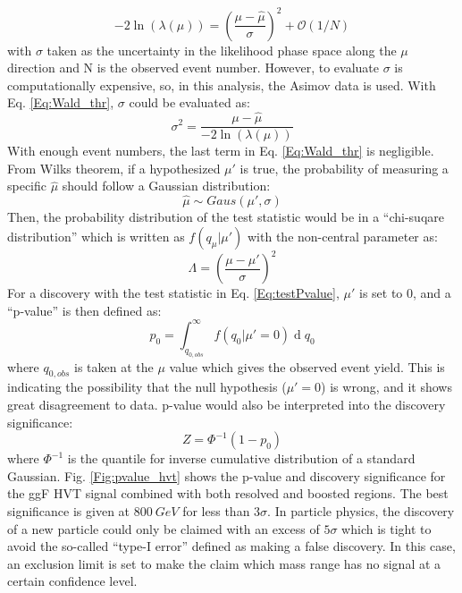 \begin{equation}
\label{Eq:Wald_thr}
-2\ln(\lambda(\mu))=(\frac{\mu-\hat{\mu}}{\sigma})^2+\mathcal{O}(1/N)
\end{equation}
with $\sigma$ taken as the uncertainty in the likelihood phase space along the $\mu$ direction and N is the observed event number. However, to evaluate $\sigma$ is computationally expensive, so, in this analysis, the Asimov data is used. With Eq. \ref{Eq:Wald_thr}, $\sigma$ could be evaluated as:
\begin{equation}
\sigma^2 = \frac{\mu-\hat{\mu}}{-2\ln(\lambda(\mu))}
\end{equation}
With enough event numbers, the last term in Eq. \ref{Eq:Wald_thr} is negligible. From Wilks theorem, if a hypothesized $\mu'$ is true, the probability of measuring a specific $\hat{\mu}$ should follow a Gaussian distribution:
\begin{equation}
\hat{\mu}\sim Gaus(\mu',\sigma)
\end{equation}
Then, the probability distribution of the test statistic would be in a ``chi-suqare distribution'' which is written as $f(q_{\mu}|\mu')$ with the non-central parameter as:
\begin{equation}
\Lambda=(\frac{\mu-\mu'}{\sigma})^2
\end{equation}
For a discovery with the test statistic in Eq. \ref{Eq:testPvalue}, $\mu'$ is set to 0, and a ``p-value'' is then defined as:
\begin{equation}
p_{0}=\int_{q_{0,obs}}^{\infty}f(q_{0}|\mu'=0)\operatorname{d}q_{0}
\end{equation}	 
where $q_{0,obs}$ is taken at the $\mu$ value which gives the observed event yield. This is indicating the possibility that the null hypothesis ($\mu'=0$) is wrong, and it shows great disagreement to data. p-value would also be interpreted into the discovery significance:
\begin{equation}
Z=\Phi^{-1}(1-p_{0})
\end{equation}
where $\Phi^{-1}$ is the quantile for inverse cumulative distribution of a standard Gaussian. Fig. \ref{Fig:pvalue_hvt} shows the p-value and discovery significance for the ggF HVT signal combined with both resolved and boosted regions. The best significance is given at $800~GeV$ for less than $3\sigma$. In particle physics, the discovery of a new particle could only be claimed with an excess of $5\sigma$ which is tight to avoid the so-called ``type-I error'' defined as making a false discovery. In this case, an exclusion limit is set to make the claim which mass range has no signal at a certain confidence level. 
